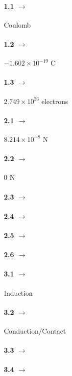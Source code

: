 \documentclass[11pt]{article}
\begin{document}
\begin{spacing}{0.5}

\paragraph{1.1 $\rightarrow$} Coulomb
\paragraph{1.2 $\rightarrow$} $-1.602 \times 10^{-19}$ C
\paragraph{1.3 $\rightarrow$} $2.749 \times 10^{26}$ electrons

\paragraph{2.1 $\rightarrow$} $8.214 \times 10^{-8}$ N
\paragraph{2.2 $\rightarrow$} 0 N
\paragraph{2.3 $\rightarrow$} 
\paragraph{2.4 $\rightarrow$}
\paragraph{2.5 $\rightarrow$}
\paragraph{2.6 $\rightarrow$}

\paragraph{3.1 $\rightarrow$} Induction
\paragraph{3.2 $\rightarrow$} Conduction/Contact
\paragraph{3.3 $\rightarrow$} 
\paragraph{3.4 $\rightarrow$} 

\end{spacing}
\end{document}
